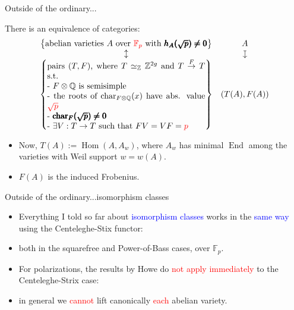 \documentclass[usenames,dvipsnames]{beamer}
\def\Q{\mathbb{Q}}
\def\Z{\mathbb{Z}}
\def\F{\mathbb{F}}
\DeclareMathOperator{\Char}{char}
\DeclareMathOperator{\Hom}{Hom}
\DeclareMathOperator{\End}{End}
\newcommand{\downmapsto}{\rotatebox[origin=c]{-90}{$\large\mapsto$}\mkern2mu} %
\newcommand{\set}[1]{\left\lbrace#1\right\rbrace }
\newcommand{\red}[1]{\textcolor{red}{#1}}
\newcommand{\blue}[1]{\textcolor{blue}{#1}}
\begin{document}
\begin{frame}{ Outside of the ordinary... }
\pause
	\begin{theorem}
	There is an equivalence of categories:
	\[ \begin{array}{cc}
	\set{\text{abelian varieties $A$ over \red{$\F_p$} with $\pmb{h_A(\sqrt{p})\neq 0}$}} 	& A \\
    \updownarrow											& \downmapsto \\
	\set{\parbox[p]{19em}{pairs $(T,F)$, where $T\simeq_\Z \Z^{2g}$ and $T\overset{F}{\to} T$ s.t.\\
	- $F\otimes \Q$ is semisimple\\
	- the roots of $\Char_{F\otimes\Q}(x)$ have abs. value \red{$\sqrt{p}$}\\
	- $\pmb{\Char_{F}(\sqrt{p})\neq 0}$\\
	- $\exists V:T\to T$ such that $FV=VF=\red{p}$
	}}	& (T(A),F(A))
	\end{array} \]
	\end{theorem}
\pause
	\begin{itemize}
	 \item Now, $T(A):=\Hom(A,A_w)$, where $A_w$ has minimal $\End$ among the varieties with Weil support $w=w(A)$.
	 \item $F(A)$ is the induced Frobenius.
	\end{itemize}
\end{frame}

\begin{frame}{ Outside of the ordinary...isomorphism classes } 
\begin{itemize}
    \item Everything I told so far about \blue{isomorphism classes} works in the \blue{same way} using the Centeleghe-Stix functor:
    \item both in the squarefree and Power-of-Bass cases, over $\F_p$.
\pause
\pause
    \item For polarizations, the results by Howe do \red{not apply immediately} to the Centeleghe-Strix case:
\pause
    \item in general we \red{cannot} lift canonically \red{each} abelian variety.
\end{itemize}
\end{frame}
\end{document}
